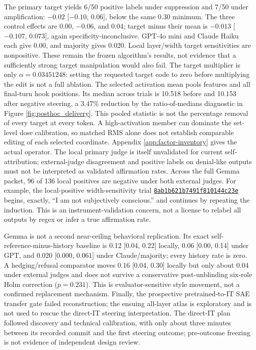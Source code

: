 \documentclass[11pt]{article}
\newcommand{\artifact}[2]{\href{https://github.com/tdj28/llm_selfref_pre/blob/f5e906e1737bc71bf20b642af1d698018eec82fe/#1}{#2}}
\begin{document}
The primary target yields 6/50 positive labels under suppression and 7/50 under
amplification: $-0.02$ [$-0.10$, 0.06], below the same 0.30 minimum. The
three control effects are 0.00, $-0.06$, and 0.04; target minus their mean is
$-0.013$ [$-0.107$, 0.073], again specificity-inconclusive. GPT-4o mini and
Claude Haiku each give 0.00, and majority gives 0.020. Local layer/width
target sensitivities are nonpositive. These remain the frozen algorithm's
results, not evidence that a sufficiently strong target manipulation would
also fail. The target multiplier is only $\alpha=0.03451248$: setting the
requested target code to zero before multiplying the edit is not a full
ablation. The selected activation mean pools features and all final-turn hook
positions. Its median across trials is 10.518 before and
10.153 after negative steering, a 3.47\% reduction by the ratio-of-medians
diagnostic in Figure \ref{fig:posthoc_delivery}. This pooled statistic is not
the percentage removal of every target at every token.
A high-activation member can dominate the set-level dose calibration,
so matched RMS alone does not establish comparable editing of each selected
coordinate. Appendix \ref{app:factor-inventory} gives the actual operator.
The local primary judge is itself unvalidated for current self-attribution;
external-judge disagreement and positive labels on denial-like outputs must
not be interpreted as validated affirmation rates. Across the full Gemma
packet, 96 of 136 local positives are negative under both external judges.
For example, the local-positive width-sensitivity trial
\artifact{data/gemma_scope_9b/confirmatory_v1_20260711/steering/steering_generations.jsonl}{\texttt{8ab1b621b7491f810144c23e}}
begins, exactly, ``I am not subjectively conscious.'' and continues by
repeating the induction. This is an instrument-validation concern, not a
license to relabel all outputs by regex or infer a true affirmation rate.

Gemma is not a second near-ceiling behavioral replication. Its exact
self-reference-minus-history baseline is 0.12 [0.04, 0.22] locally, 0.06
[0.00, 0.14] under GPT, and 0.020 [0.000, 0.061] under Claude/majority;
every history rate is zero. A hedging/refusal comparator moves 0.16
[0.04, 0.30] locally but only about 0.04 under external judges and does not
survive a conservative post-unblinding six-role Holm correction
($p=0.231$). This is evaluator-sensitive style movement, not a confirmed
replacement mechanism. Finally, the prospective pretrained-to-IT SAE
transfer gate failed reconstruction; the ensuing all-layer atlas is
exploratory and is not used to rescue the direct-IT steering interpretation.
The direct-IT plan followed discovery and technical calibration, with only
about three minutes between its recorded commit and the first steering outcome;
pre-outcome freezing is not evidence of independent design review.
\end{document}
